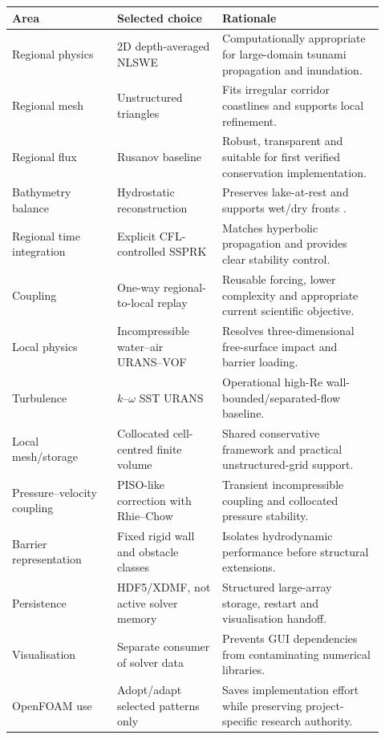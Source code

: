 \documentclass[11pt,a4paper]{article}
\begin{document}
\begin{longtable}{p{0.26\linewidth}p{0.26\linewidth}p{0.40\linewidth}}
\toprule
Area & Selected choice & Rationale\\
\midrule
Regional physics & 2D depth-averaged NLSWE & Computationally appropriate for large-domain tsunami propagation and inundation.\\
Regional mesh & Unstructured triangles & Fits irregular corridor coastlines and supports local refinement.\\
Regional flux & Rusanov baseline & Robust, transparent and suitable for first verified conservation implementation.\\
Bathymetry balance & Hydrostatic reconstruction & Preserves lake-at-rest and supports wet/dry fronts \cite{audusse2004}.\\
Regional time integration & Explicit CFL-controlled SSPRK & Matches hyperbolic propagation and provides clear stability control.\\
Coupling & One-way regional-to-local replay & Reusable forcing, lower complexity and appropriate current scientific objective.\\
Local physics & Incompressible water--air URANS--VOF & Resolves three-dimensional free-surface impact and barrier loading.\\
Turbulence & $k$--$\omega$ SST URANS & Operational high-Re wall-bounded/separated-flow baseline.\\
Local mesh/storage & Collocated cell-centred finite volume & Shared conservative framework and practical unstructured-grid support.\\
Pressure--velocity coupling & PISO-like correction with Rhie--Chow & Transient incompressible coupling and collocated pressure stability.\\
Barrier representation & Fixed rigid wall and obstacle classes & Isolates hydrodynamic performance before structural extensions.\\
Persistence & HDF5/XDMF, not active solver memory & Structured large-array storage, restart and visualisation handoff.\\
Visualisation & Separate consumer of solver data & Prevents GUI dependencies from contaminating numerical libraries.\\
OpenFOAM use & Adopt/adapt selected patterns only & Saves implementation effort while preserving project-specific research authority.\\
\bottomrule
\end{longtable}
\end{document}
